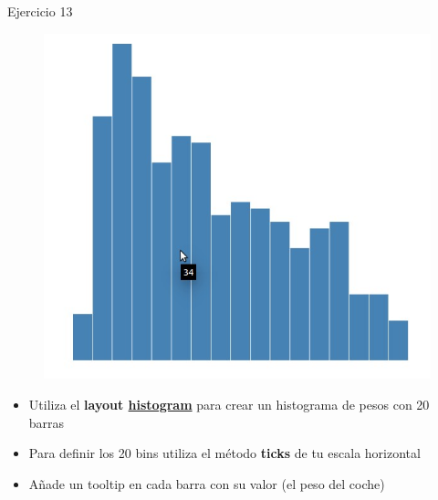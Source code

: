 \documentclass[ignorenonframetext,]{beamer}
\makeatletter
\def\ScaleIfNeededW{%
  \ifdim\Gin@nat@width>\linewidth
    \linewidth
  \else
    \Gin@nat@width
  \fi
}
\def\ScaleIfNeededH{%
  \ifdim\Gin@nat@height>0.6\textheight
    0.6\textheight
  \else
    \Gin@nat@height
  \fi
}
\let\Oldincludegraphics\includegraphics
\renewcommand{\includegraphics}[2][]{\Oldincludegraphics[width=\ScaleIfNeededW, height=\ScaleIfNeededH,keepaspectratio]{#2}}
\makeatother
\begin{document}
\begin{frame}{Ejercicio 13}

\begin{figure}[htbp]
\centering
\includegraphics{../rsc/images/ej13.jpg}
\end{figure}

\end{frame}

\begin{frame}

\begin{itemize}
\item
  Utiliza el \textbf{layout
  \href{https://github.com/mbostock/d3/wiki/Histogram-Layout}{histogram}}
  para crear un histograma de pesos con 20 barras
\item
  Para definir los 20 bins utiliza el método \textbf{ticks} de tu escala
  horizontal
\item
  Añade un tooltip en cada barra con su valor (el peso del coche)
\end{itemize}

\end{frame}
\end{document}
